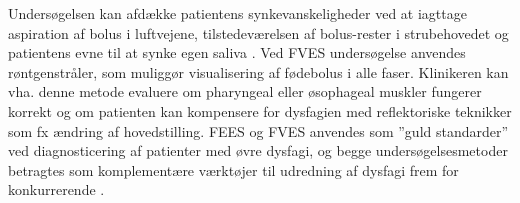 \documentclass[main.tex]{subfiles}
\begin{document}
Undersøgelsen kan afdække patientens synkevanskeligheder ved at iagttage aspiration af bolus i luftvejene, tilstedeværelsen af bolus-rester i strubehovedet og patientens evne til at synke egen saliva \cite[s. 27-28]{Kjaersgaard2013DifficultiesPerspective}. 
Ved FVES undersøgelse anvendes røntgenstråler, som muliggør visualisering af fødebolus i alle faser. Klinikeren kan vha. denne metode evaluere om pharyngeal eller øsophageal muskler fungerer korrekt og om patienten kan kompensere for dysfagien med reflektoriske teknikker som fx ændring af hovedstilling. FEES og FVES anvendes som ”guld standarder” ved diagnosticering af patienter med øvre dysfagi, og begge undersøgelsesmetoder betragtes som komplementære værktøjer til udredning af dysfagi frem for konkurrerende \cite[s. 50]{Kjaersgaard2013DifficultiesPerspective}.




\end{document}
